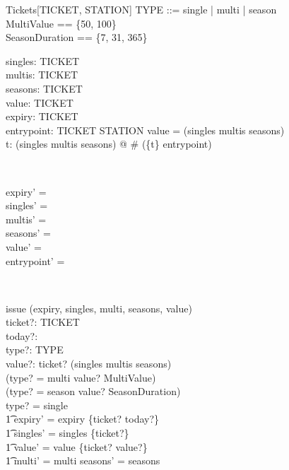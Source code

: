 \begin{class}{Tickets}[TICKET, STATION]
\also
TYPE ::= single | multi | season \\
MultiValue == \{50, 100\} \\ 
SeasonDuration == \{7, 31, 365\}
\begin{state}
singles:  \power TICKET \\ 
multis:  \power TICKET \\ 
seasons:  \power TICKET \\ 
value: TICKET \pfun  \nat  \\ 
expiry: TICKET \pfun  \nat  \\ 
entrypoint: TICKET \pfun STATION 
\where
 \dom value = (singles \cup multis \cup seasons) \\ 
\forall t: (singles \cup multis \cup seasons) @ \# (\{t\} \dres
entrypoint) \end{state} \\ 
\begin{init}
expiry' = \emptyset \\ 
singles' = \emptyset \\ 
multis' = \emptyset \\ 
seasons' = \emptyset \\ 
value' = \emptyset \\ 
entrypoint' = \emptyset
\end{init} \\ 
\begin{op}{issue}
\Delta (expiry, singles, multi, seasons, value)\\
ticket?: TICKET \\ 
today?:  \nat  \\ 
type?: TYPE \\ 
value?:  \nat  
\where
 ticket? \notin (singles \cup multis \cup seasons) \land\\
       (type? = multi \implies value? \in MultiValue) \land\\
       (type? = season \implies value? \in SeasonDuration)\\
type? = single \implies \\
\t1 expiry' = expiry \cup \{ticket? \mapsto today?\} \land \\ 
\t1 singles' = singles \cup \{ticket?\} \land \\ 
\t1 value' = value \cup \{ticket? \mapsto value?\} \land\\ 
\t1 multi' = multi \land seasons' = seasons\\

\end{op}
\end{class}
